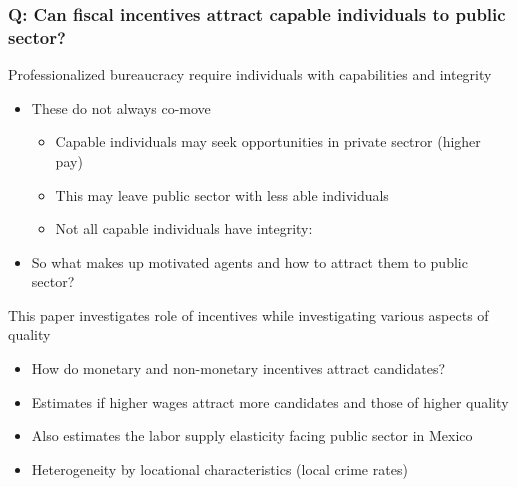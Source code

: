 \documentclass[aspectratio=169]{beamer}
\begin{document}
\begin{frame}
\frametitle{Q: Can fiscal incentives attract capable individuals to public sector?} 
Professionalized bureaucracy require individuals with capabilities and integrity
\begin{itemize}\setlength\itemsep{3pt}
\item These do not always co-move
\begin{itemize}\setlength\itemsep{3pt}
\item Capable individuals may seek opportunities in private sectror (higher pay)
\item This may leave public sector with less able individuals
\item Not all capable individuals have integrity:
\end{itemize}
\item So what makes up motivated agents and how to attract them to public sector?
\end{itemize}\medskip
This paper investigates role of incentives while investigating various aspects of quality
\begin{itemize}\setlength\itemsep{3pt}
\item How do monetary and non-monetary incentives attract candidates?
\item Estimates if higher wages attract more candidates and those of higher quality
\item Also estimates the labor supply elasticity facing public sector in Mexico
\item Heterogeneity by locational characteristics (local crime rates)
\end{itemize}
\end{frame}
\end{document}
